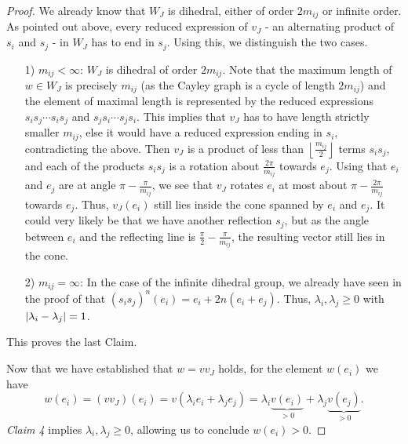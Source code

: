 \begin{proof}
{        %
        We already know that \(W_J\) is dihedral, either of order \(2m_{ij}\) or infinite order.
        As pointed out above, every reduced expression of \(v_J\) - an alternating product of \(s_i\) and \(s_j\) - in \(W_J\) has to end in \(s_j\).
        Using this, we distinguish the two cases.
        \begin{itemize} %
            \item[1)] \(m_{ij} < \infty\): \(W_J\) is dihedral of order \(2m_{ij}\). %
                  Note that the maximum length of \(w \in W_J\) is precisely \(m_{ij}\) (as the Cayley graph is a cycle of length \(2m_{ij}\)) and the element of maximal length is represented by the reduced expressions \(s_is_j\cdots s_is_j\) and \(s_js_i\cdots s_js_i\).
                  This implies that \(v_J\) has to have length strictly smaller \(m_{ij}\), else it would have a reduced expression ending in \(s_i\), contradicting the above.
                  Then \(v_J\) is a product of less than \(\left\lfloor\frac{m_{ij}}{2}\right\rfloor\) terms \(s_is_j\), and each of the products \(s_is_j\) is a rotation about \(\frac{2\pi}{m_{ij}}\) towards \(e_j\).\newline
                  Using that \(e_i\) and \(e_j\) are at angle \(\pi - \frac{\pi}{m_{ij}}\), we see that \(v_J\) rotates \(e_i\) at most about \(\pi - \frac{2\pi}{m_{ij}}\) towards \(e_j\).
                  Thus, \(v_J(e_i)\) still lies inside the cone spanned by \(e_i\) and \(e_j\).
                  It could very likely be that we have another reflection \(s_j\), but as the angle between \(e_i\) and the reflecting line is \(\frac{\pi}{2} - \frac{\pi}{m_{ij}}\), the resulting vector still lies in the cone.
                
            \item[2)] \(m_{ij} = \infty\): In the case of the infinite dihedral group, we already have seen in the proof of  that \((s_is_j)^n(e_i) = e_i + 2n(e_i + e_j)\).
                  Thus, \(\lambda_i, \lambda_j \geq 0\) with \(\left\vert \lambda_i - \lambda_j\right\vert = 1\).
        \end{itemize}
        This proves the last Claim.
    }
    Now that we have established that \(w = vv_J\) holds, for the element \(w(e_i)\) we have
    \[w(e_i) = (vv_J)(e_i) = v(\lambda_i e_i + \lambda_j e_j) = \lambda_i \underbrace{v(e_i)}_{> 0} + \lambda_j \underbrace{v(e_j)}_{> 0}.\]
    \emph{Claim 4} implies \(\lambda_i, \lambda_j \geq 0\), allowing us to conclude \(w(e_i) > 0\).
\end{proof}

